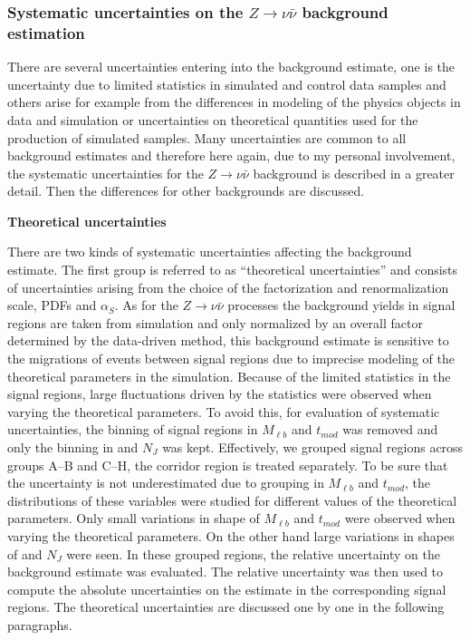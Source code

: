 \subsubsection{Systematic uncertainties on the $Z \to \nu \bar{\nu}$ background estimation}


There are several uncertainties entering into the background estimate, one is the uncertainty due to limited statistics in simulated and control data samples and others arise for example from the differences in modeling of the physics objects in data and simulation or uncertainties on theoretical quantities used for the production of simulated samples. Many uncertainties are common to all background estimates and therefore here again, due to my personal involvement, the systematic uncertainties for the $Z \to \nu \bar{\nu}$ background is described in a greater detail. Then the differences for other backgrounds are discussed.

\textbf{Theoretical uncertainties}

There are two kinds of systematic uncertainties affecting the background estimate. The first group is referred to as ``theoretical uncertainties'' and consists of uncertainties arising from the choice of the factorization and renormalization scale, PDFs and $\alpha_{S}$. As for the $Z \to \nu  \bar{\nu}$ processes the background yields in signal regions are taken from simulation and only normalized by an overall factor determined by the data-driven method, this background estimate is sensitive to the migrations of events between signal regions due to imprecise modeling of the theoretical parameters in the simulation. Because of the limited statistics in the signal regions, large fluctuations driven by the statistics were observed when varying the theoretical parameters. To avoid this, for evaluation of systematic uncertainties, the binning of signal regions in $M_{\ell b}$ and $t_{mod}$ was removed and only the binning in \MET and $N_{J}$ was kept. Effectively, we grouped signal regions across groups A--B and C--H, the corridor region is treated separately. To be sure that the uncertainty is not underestimated due to grouping in $M_{\ell b}$ and $t_{mod}$, the distributions of these variables were studied for different values of the theoretical parameters. Only small variations in shape of $M_{\ell b}$ and $t_{mod}$ were observed when varying the theoretical parameters. On the other hand large variations in shapes of \MET and $N_{J}$ were seen. In these grouped regions, the relative uncertainty on the background estimate was evaluated. The relative uncertainty was then used to compute the absolute uncertainties on the estimate in the corresponding signal regions.  The theoretical uncertainties are discussed one by one in the following paragraphs.


